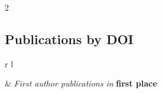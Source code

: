 \documentclass[
	10pt, %
]{RESUME}
\begin{document}
\begin{paracol}{2}




	\subsection{Publications by DOI}

	\begin{supertabular}{r l} %




		& \textit{First author publications in} \textbf{first place}\\


	\end{supertabular}

	\medskip %


\end{paracol} %

\end{document}
